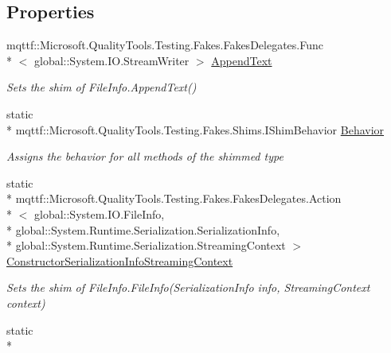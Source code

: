\subsection*{Properties}
\begin{DoxyCompactItemize}
\item 
mqttf\-::\-Microsoft.\-Quality\-Tools.\-Testing.\-Fakes.\-Fakes\-Delegates.\-Func\\*
$<$ global\-::\-System.\-I\-O.\-Stream\-Writer $>$ \hyperlink{class_system_1_1_i_o_1_1_fakes_1_1_shim_file_info_aa03689f03b507ab78fa1f2a268a80000}{Append\-Text}
\begin{DoxyCompactList}\small\item\em Sets the shim of File\-Info.\-Append\-Text()\end{DoxyCompactList}\item 
static \\*
mqttf\-::\-Microsoft.\-Quality\-Tools.\-Testing.\-Fakes.\-Shims.\-I\-Shim\-Behavior \hyperlink{class_system_1_1_i_o_1_1_fakes_1_1_shim_file_info_aa32e5607cce12b967836db5a4a4090a6}{Behavior}
\begin{DoxyCompactList}\small\item\em Assigns the behavior for all methods of the shimmed type\end{DoxyCompactList}\item 
static \\*
mqttf\-::\-Microsoft.\-Quality\-Tools.\-Testing.\-Fakes.\-Fakes\-Delegates.\-Action\\*
$<$ global\-::\-System.\-I\-O.\-File\-Info, \\*
global\-::\-System.\-Runtime.\-Serialization.\-Serialization\-Info, \\*
global\-::\-System.\-Runtime.\-Serialization.\-Streaming\-Context $>$ \hyperlink{class_system_1_1_i_o_1_1_fakes_1_1_shim_file_info_a6fe7345c2c346f99c9ea67d94c8ffb1f}{Constructor\-Serialization\-Info\-Streaming\-Context}
\begin{DoxyCompactList}\small\item\em Sets the shim of File\-Info.\-File\-Info(\-Serialization\-Info info, Streaming\-Context context)\end{DoxyCompactList}\item 
static \\*

\end{DoxyCompactItemize}
